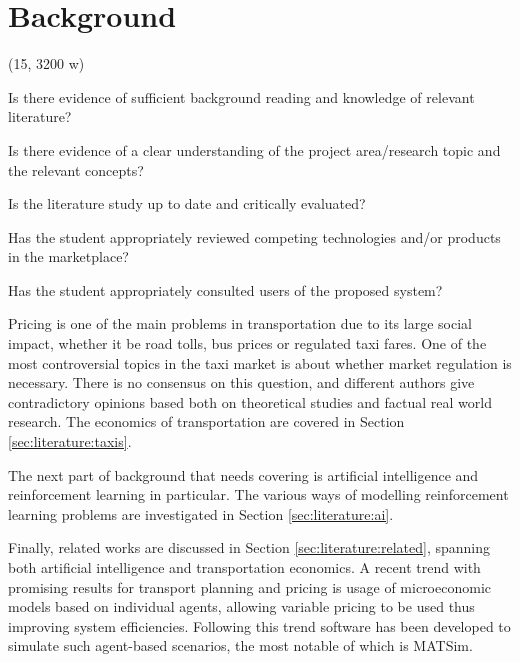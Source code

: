\newpage
\section{Background}
\label{sec:literature}

(15, 3200 w)

Is there evidence of sufficient background reading and knowledge of relevant
literature?

Is there evidence of a clear understanding of the project area/research topic
and the relevant concepts?

Is the literature study up to date and critically evaluated?

Has the student appropriately reviewed competing technologies and/or products
in the marketplace?

Has the student appropriately consulted users of the proposed system?


Pricing is one of the main problems in transportation due to its large social
impact, whether it be road tolls, bus prices or regulated taxi fares. One of
the most controversial topics in the taxi market is about whether market
regulation is necessary. There is no consensus on this question, and different
authors give contradictory opinions based both on theoretical studies and
factual real world research. The economics of transportation are covered in
Section \ref{sec:literature:taxis}.

The next part of background that needs covering is artificial intelligence and
reinforcement learning in particular. The various ways of modelling
reinforcement learning problems are investigated in Section
\ref{sec:literature:ai}.

Finally, related works are discussed in Section \ref{sec:literature:related},
spanning both artificial intelligence and transportation economics. A recent
trend with promising results for transport planning and pricing is usage of
microeconomic models based on individual agents, allowing variable pricing to
be used thus improving system efficiencies. Following this trend software has
been developed to simulate such agent-based scenarios, the most notable of
which is MATSim.
